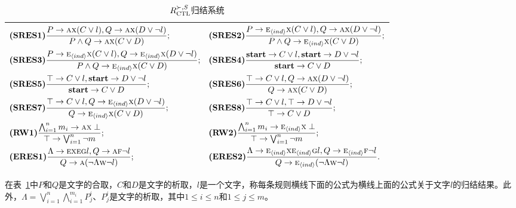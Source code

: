 \begin{table}[tb]%
	\small
	\centering
	\caption{$R_{\textrm{CTL}}^{\succ,S}$归结系统}\label{tab:res}
	\begin{tabular}{l}
		\toprule
		$
		\begin{aligned}
			& \textbf{(SRES1)}\frac{P\rightarrow \textsc{a}\textsc{x}(C\vee l), Q\rightarrow \textsc{a}\textsc{x}(D\vee \neg l)}{P\wedge Q \rightarrow \textsc{a}\textsc{x}(C\vee D)};
			&& \textbf{(SRES2)} \frac{P\rightarrow \textsc{e}_{{\langle{ind}\rangle}} \textsc{x}(C\vee l), Q\rightarrow \textsc{a}\textsc{x}(D\vee \neg l)}{P\wedge Q \rightarrow \textsc{e}_{{\langle{ind}\rangle}}\textsc{x}(C\vee D)};\\
			& \textbf{(SRES3)} \frac{P\rightarrow \textsc{e}_{{\langle{ind}\rangle}}\textsc{x}(C\vee l), Q \rightarrow \textsc{e}_{{\langle{ind}\rangle}}\textsc{x}(D\vee \neg l)}{P\wedge Q\rightarrow\textsc{e}_{{\langle{ind}\rangle}}\textsc{x}(C\vee D)};  
			&&   \textbf{(SRES4)} \frac{\textbf{start} \rightarrow C\vee l, \textbf{start} \rightarrow D \vee \neg l}{\textbf{start} \rightarrow C\vee D}; \\
			& \textbf{(SRES5)} \frac{\top \rightarrow C\vee l, \textbf{start} \rightarrow D \vee \neg l}{\textbf{start} \rightarrow C \vee D};
			&&  \textbf{(SRES6)} \frac{\top \rightarrow C \vee l, Q \rightarrow \textsc{a}\textsc{x}(D \vee \neg l)}{Q\rightarrow \textsc{a} \textsc{x}(C\vee D)}; \\
			& \textbf{(SRES7)} \frac{\top \rightarrow C \vee l, Q \rightarrow \textsc{e}_{{\langle{ind}\rangle}} \textsc{x}(D \vee \neg l)}{Q\rightarrow \textsc{e}_{{\langle{ind}\rangle}}\textsc{x}(C\vee D)}; 
			&&  \textbf{(SRES8)} \frac{\top \rightarrow C\vee l, \top \rightarrow D \vee \neg l}{\top \rightarrow C \vee D};\\
			& \textbf{(RW1)} \frac{\bigwedge_{i=1}^n m_i \rightarrow \textsc{a}\textsc{x} \perp}{\top \rightarrow \bigvee_{i=1}^n \neg m}; 
			&& \textbf{(RW2)} \frac{\bigwedge_{i=1}^n m_i \rightarrow \textsc{e}_{{\langle{ind}\rangle}}\textsc{x} \perp}{\top \rightarrow \bigvee_{i=1}^n \neg m}; \\
			& \textbf{(ERES1)} \frac{\Lambda \rightarrow \textsc{e} \textsc{x} \textsc{e}\textsc{g} l, Q \rightarrow \textsc{a} \textsc{f} \neg l}{Q \rightarrow \textsc{a}(\neg \Lambda \textsc{w} \neg l)};
			&& \textbf{(ERES2)} \frac{\Lambda \rightarrow \textsc{e}_{{\langle{ind}\rangle}} \textsc{x} \textsc{e}_{{\langle{ind}\rangle}}\textsc{g} l, Q \rightarrow \textsc{e}_{{\langle{ind}\rangle}} \textsc{f} \neg l}{Q \rightarrow \textsc{e}_{{\langle{ind}\rangle}}(\neg \Lambda \textsc{w} \neg l)}.
		\end{aligned}
		$\\
		\bottomrule
	\end{tabular}
\end{table}
在表~\ref{tab:res}中$P$和$Q$是文字的合取，$C$和$D$是文字的析取，$l$是一个文字，称每条规则横线下面的公式为横线上面的公式关于文字$l$的归结结果。此外，$\Lambda=\bigvee_{i=1}^n \bigwedge_{i=1}^{m_i}P_j^i$、$P_j^i$是文字的析取，其中$1\leq i\leq n$和$1\leq j\leq m$。

